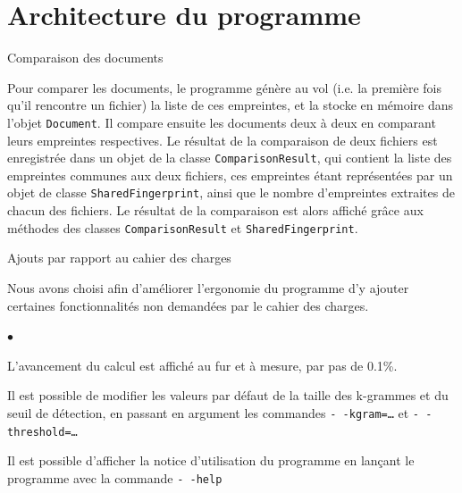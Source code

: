 \documentclass[a4paper,twoside,12pt]{article}
\newcounter{partie}
\newcounter{sous-partie}
\newenvironment{partie}[1]
{
\section{#1}
}
{

}
\newenvironment{sous-partie}[1]
{
\subsection{#1}
}
{

}
\newenvironment{liste}
{
\vspace{0.2cm}
\begin{list}{$\bullet$\hspace{0.3cm}}{\leftmargin=1.4cm}
}
{
\end{list}
\vspace{0.2cm}
}
\begin{document}
\begin{partie}{Architecture du programme}
\begin{sous-partie}{Comparaison des documents}
\begin{paragraph}{}
Pour comparer les documents, le programme génère au vol (i.e. la première fois qu'il rencontre un fichier) la liste de ces empreintes, et la stocke en mémoire dans l'objet \texttt{Document}. Il compare ensuite les documents deux à deux en comparant leurs empreintes respectives. Le résultat de la comparaison de deux fichiers est enregistrée dans un objet de la classe \texttt{ComparisonResult}, qui contient la liste des empreintes communes aux deux fichiers, ces empreintes étant représentées par un objet de classe \texttt{SharedFingerprint}, ainsi que le nombre d'empreintes extraites de chacun des fichiers. Le résultat de la comparaison est alors affiché grâce aux méthodes des classes \texttt{ComparisonResult} et  \texttt{SharedFingerprint}.
\end{paragraph}
\end{sous-partie}

\begin{sous-partie}{Ajouts par rapport au cahier des charges}
\begin{paragraph}{}
Nous avons choisi afin d'améliorer l'ergonomie du programme d'y ajouter certaines fonctionnalités non demandées par le cahier des charges.

\begin{liste}
\item L'avancement du calcul est affiché au fur et à mesure, par pas de 0.1\%.
\item Il est possible de modifier les valeurs par défaut de la taille des k-grammes et du seuil de détection, en passant en argument les commandes \texttt{-\,\!-kgram=\dots} et \texttt{-\,\!-threshold=\dots}
\item Il est possible d'afficher la notice d'utilisation du programme en lançant le programme avec la commande \texttt{-\,\!-help}
\end{liste}

\end{paragraph}
\end{sous-partie}

\end{partie}

\clearpage
\end{document}
